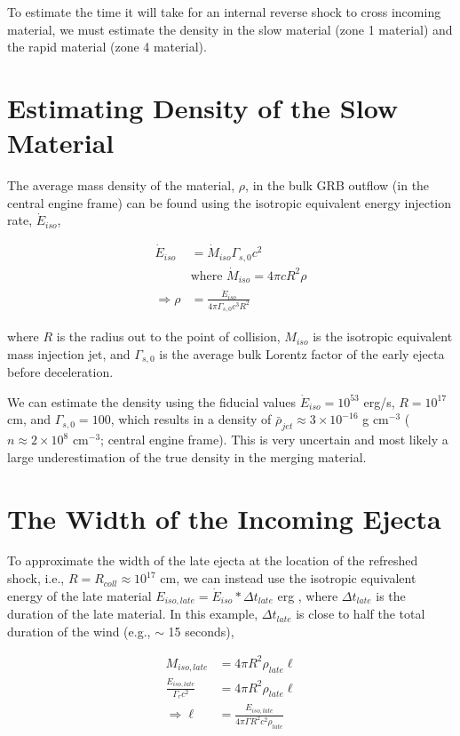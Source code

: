 \documentclass[linenumbers,twocolumn]{aastex631}
\begin{document}
To estimate the time it will take for an internal reverse shock to cross incoming material, we must estimate the density in the slow material (zone 1 material) and the rapid material (zone 4 material). 

\section{Estimating Density of the Slow Material}

The average mass density of the material, $\rho$, in the bulk GRB outflow (in the central engine frame) can be found using the isotropic equivalent energy injection rate, $\dot{E}_{iso}$, 

\begin{align}
\dot{E}_{iso} &= \dot{M}_{iso} \Gamma_{s,0} c^2\\
&\text{where } \dot{M}_{iso} = 4 \pi c R^2 \rho\\
\Rightarrow \rho &= \frac{\dot{E}_{iso}}{4\pi \Gamma_{s,0} c^3 R^2}
\end{align}

where $R$ is the radius out to the point of collision, $M_{iso}$ is the isotropic equivalent mass injection jet, and $\Gamma_{s,0}$ is the average bulk Lorentz factor of the early ejecta before deceleration. 

We can estimate the density using the fiducial values $\dot{E}_{iso} = 10^{53}$ erg/s, $R=10^{17}$ cm, and $\Gamma_{s,0} = 100$, which results in a density of $\bar{\rho}_{jet}\approx 3\times10^{-16}$ g cm$^{-3}$ ($n \approx 2\times 10^{8}$ cm$^{-3}$; central engine frame). This is very uncertain and most likely a large underestimation of the true density in the merging material.

\section{The Width of the Incoming Ejecta}

To approximate the width of the late ejecta at the location of the refreshed shock, i.e., $R = R_{coll} \approx 10^{17}$ cm, we can instead use the isotropic equivalent energy of the late material $E_{iso,late} = \dot{E}_{iso} * \Delta t_{late}$ erg , where $\Delta t_{late}$ is the duration of the late material. In this example, $\Delta t_{late}$ is close to half the total duration of the wind (e.g., $\sim$ 15 seconds), 

\begin{align}
    M_{iso,late} &= 4 \pi R^2 \rho_{late} \ell\\
    \frac{E_{iso,late}}{\Gamma_r c^2} &= 4\pi R^2 \rho_{late} \ell\\
    \Rightarrow \ell &= \frac{E_{iso,late}}{4\pi\Gamma R^2 c^2 \rho_{late}}
\end{align}
\end{document}

